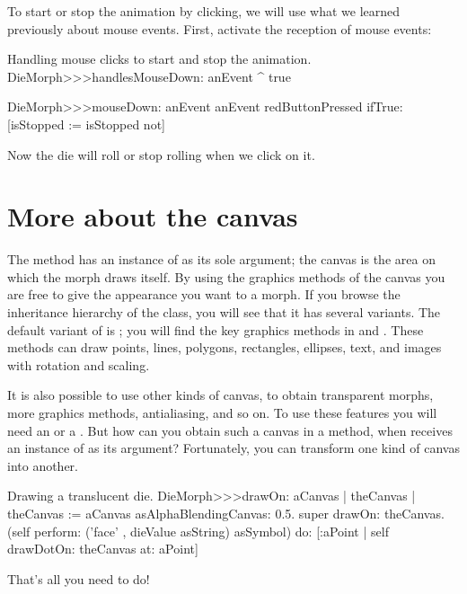 \documentclass[a4paper,10pt,twoside]{book}
\begin{document}
To start or stop the animation by clicking, we will use what we learned previously about mouse events.
First, activate the reception of mouse events:

\begin{methods}{Handling mouse clicks to start and stop the animation.}
DieMorph>>>handlesMouseDown: anEvent
	^ true

DieMorph>>>mouseDown: anEvent
	anEvent redButtonPressed
		ifTrue: [isStopped := isStopped not]
\end{methods}
Now the die will roll or stop rolling when we click on it.



\section{More about the canvas}

The  method has an instance of  as its sole argument;
the canvas is the area on which the morph draws itself.
By using the graphics methods of the canvas you are free to give the appearance you want to a morph.
If you browse the inheritance hierarchy of the  class, you will see that it has several variants.
The default variant of  is ; you will find the key graphics methods in  and .
These methods can draw points, lines, polygons, rectangles, ellipses, text, and images with rotation and scaling.

It is also possible to use other kinds of canvas, to obtain transparent morphs, more graphics methods, antialiasing, and so on.
To use these features you will need an  or a .
But how can you obtain such a canvas in a  method, when  receives an instance of  as its argument?
Fortunately, you can transform one kind of canvas into another.

\begin{method}{Drawing a translucent die.}
DieMorph>>>drawOn: aCanvas
	| theCanvas |
	theCanvas := aCanvas asAlphaBlendingCanvas: 0.5.
	super drawOn: theCanvas.
	(self perform: ('face' , dieValue asString) asSymbol)
		do: [:aPoint | self drawDotOn: theCanvas at: aPoint]
\end{method}
\noindent
That's all you need to do!
\end{document}

